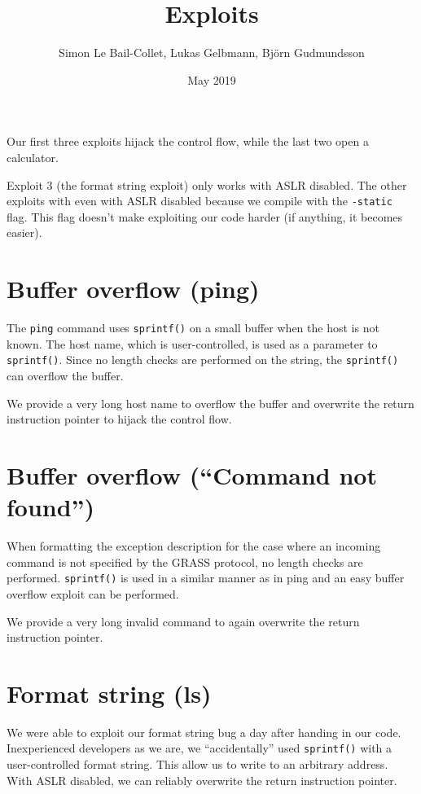 \documentclass{article}
\title{Exploits}
\author{Simon Le Bail-Collet, Lukas Gelbmann, Björn Gudmundsson}
\date{May 2019}
\begin{document}
\maketitle


Our first three exploits hijack the control flow, while the last two open a calculator.

Exploit 3 (the format string exploit) only works with ASLR disabled.
The other exploits with even with ASLR disabled because we compile with the \texttt{-static} flag.
This flag doesn't make exploiting our code harder (if anything, it becomes easier).


\section{Buffer overflow (ping)}

The \texttt{ping} command uses \texttt{sprintf()} on a small buffer when the host is not known.
The host name, which is user-controlled, is used as a parameter to \texttt{sprintf()}.
Since no length checks are performed on the string, the \texttt{sprintf()} can overflow the buffer.

We provide a very long host name to overflow the buffer and overwrite the return instruction pointer to hijack the control flow.


\section{Buffer overflow (``Command not found'')}

When formatting the exception description for the case where an incoming command is not specified by the GRASS protocol, no length checks are performed.
\texttt{sprintf()} is used in a similar manner as in ping and an easy buffer overflow exploit can be performed.

We provide a very long invalid command to again overwrite the return instruction pointer.


\section{Format string (ls)}

We were able to exploit our format string bug a day after handing in our code.
Inexperienced developers as we are, we ``accidentally'' used \texttt{sprintf()} with a user-controlled format string.
This allow us to write to an arbitrary address.
With ASLR disabled, we can reliably overwrite the return instruction pointer.
\end{document}
